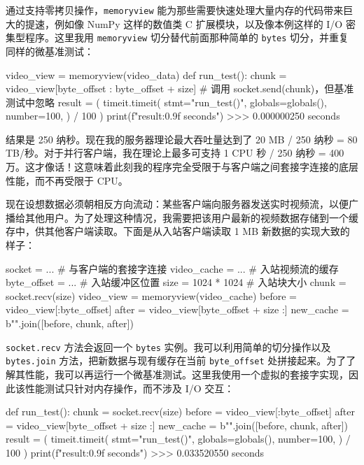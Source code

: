 通过支持零拷贝操作，\texttt{memoryview} 能为那些需要快速处理大量内存的代码带来巨大的提速，例如像 NumPy 这样的数值类 C 扩展模块，以及像本例这样的 I/O 密集型程序。这里我用 \texttt{memoryview} 切分替代前面那种简单的 \texttt{bytes} 切分，并重复同样的微基准测试：

\begin{codebox}[python]
video_view = memoryview(video_data)
def run_test():
    chunk = video_view[byte_offset : byte_offset + size]
    # 调用 socket.send(chunk)，但基准测试中忽略
    result = (
        timeit.timeit(
            stmt="run_test()",
            globals=globals(),
            number=100,
        )
        / 100
    )
    print(f"{result:0.9f} seconds")
>>>
0.000000250 seconds
\end{codebox}

结果是 250 纳秒。现在我的服务器理论最大吞吐量达到了 20 MB / 250 纳秒 = 80 TB/秒。对于并行客户端，我在理论上最多可支持 1 CPU 秒 / 250 纳秒 = 400 万。这才像话！这意味着此刻我的程序完全受限于与客户端之间套接字连接的底层性能，而不再受限于 CPU。

现在设想数据必须朝相反方向流动：某些客户端向服务器发送实时视频流，以便广播给其他用户。为了处理这种情况，我需要把该用户最新的视频数据存储到一个缓存中，供其他客户端读取。下面是从入站客户端读取 1 MB 新数据的实现大致的样子：

\begin{codebox}[python]
socket = ...        # 与客户端的套接字连接
video_cache = ...   # 入站视频流的缓存
byte_offset = ...   # 入站缓冲区位置
size = 1024 * 1024  # 入站块大小
chunk = socket.recv(size)
video_view = memoryview(video_cache)
before = video_view[:byte_offset]
after = video_view[byte_offset + size :]
new_cache = b"".join([before, chunk, after])
\end{codebox}

\texttt{socket.recv} 方法会返回一个 \texttt{bytes} 实例。我可以利用简单的切分操作以及 \texttt{bytes.join} 方法，把新数据与现有缓存在当前 \texttt{byte\_offset} 处拼接起来。为了了解其性能，我可以再运行一个微基准测试。这里我使用一个虚拟的套接字实现，因此该性能测试只针对内存操作，而不涉及 I/O 交互：

\begin{codebox}[python]
def run_test():
    chunk = socket.recv(size)
    before = video_view[:byte_offset]
    after = video_view[byte_offset + size :]
    new_cache = b"".join([before, chunk, after])
    result = (
        timeit.timeit(
            stmt="run_test()",
            globals=globals(),
            number=100,
        )
        / 100
    )
    print(f"{result:0.9f} seconds")
>>>
0.033520550 seconds
\end{codebox}

